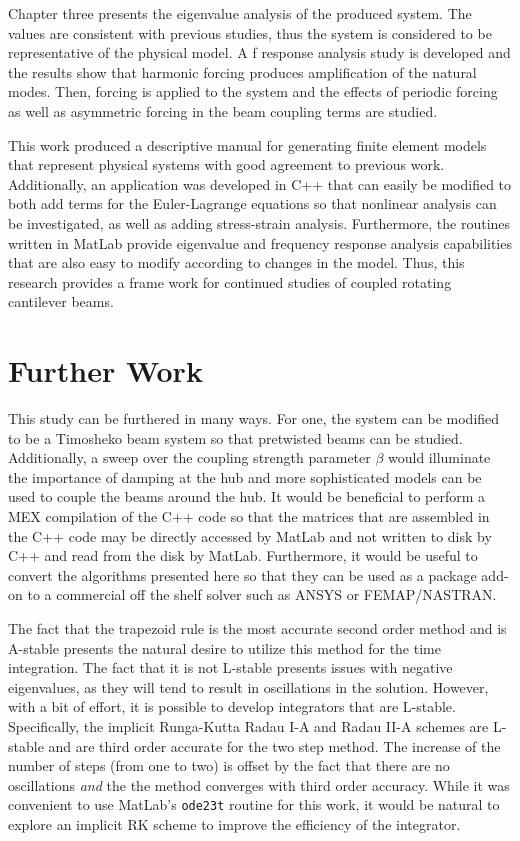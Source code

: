 Chapter three presents the eigenvalue analysis of the produced system. The values are consistent with previous studies, thus the system is considered to be representative of the physical model. A f response analysis study is developed and the results show that harmonic forcing produces amplification of the natural modes. Then, forcing is applied to the system and the effects of periodic forcing as well as asymmetric forcing in the beam coupling terms are studied.

This work produced a descriptive manual for generating finite element models that represent physical systems with good agreement to previous work. Additionally, an application was developed in C++ that can easily be modified to both add terms for the Euler-Lagrange equations so that nonlinear analysis can be investigated, as well as adding stress-strain analysis. Furthermore, the routines written in MatLab provide eigenvalue and frequency response analysis capabilities that are also easy to modify according to changes in the model. Thus, this research provides a frame work for continued studies of coupled rotating cantilever beams.

\section{Further Work}
This study can be furthered in many ways. For one, the system can be modified to be a Timosheko beam system so that pretwisted beams can be studied. Additionally, a sweep over the coupling strength parameter $\beta$ would illuminate the importance of damping at the hub and more sophisticated models can be used to couple the beams around the hub. It would be beneficial to perform a MEX compilation of the C++ code so that the matrices that are assembled in the C++ code may be directly accessed by MatLab and not written to disk by C++ and read from the disk by MatLab. Furthermore, it would be useful to convert the algorithms presented here so that they can be used as a package add-on to a commercial off the shelf solver such as ANSYS or FEMAP/NASTRAN.

The fact that the trapezoid rule is the most accurate second order method and is A-stable presents the natural desire to utilize this method for the time integration. The fact that it is not L-stable presents issues with negative eigenvalues, as they will tend to result in oscillations in the solution. However, with a bit of effort, it is possible to develop integrators that are L-stable. Specifically, the implicit Runga-Kutta Radau I-A and Radau II-A schemes are L-stable and are third order accurate for the two step method. The increase of the number of steps (from one to two) is offset by the fact that there are no oscillations \emph{and} the the method converges with third order accuracy. While it was convenient to use MatLab's \texttt{ode23t} routine for this work, it would be natural to explore an implicit RK scheme to improve the efficiency of the integrator.
 
